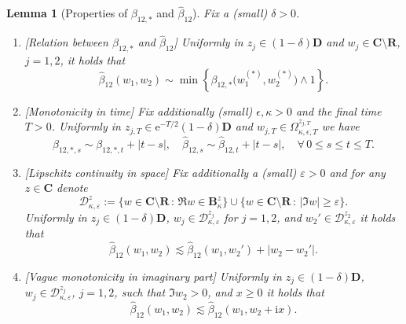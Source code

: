 \documentclass[10pt]{amsart}
\newtheorem{lemma}[theorem]{Lemma}
\numberwithin{equation}{section}
\newcommand{\R}{\mathbf{R}}
\newcommand{\C}{\mathbf{C}}
\newcommand{\ii}{\mathrm{i}}
\newcommand{\ee}{\mathrm{e}}
\begin{document}
\begin{lemma}[Properties of $\beta_{12,*}$ and $\widehat{\beta}_{12}$]\label{lem:beta_hat} Fix a (small) $\delta>0$.
\begin{enumerate}
\item \emph{[Relation between $\beta_{12,*}$ and $\widehat{\beta}_{12}$]} Uniformly in $z_j\in(1-\delta)\mathbf{D}$ and $w_j\in\C\setminus\R$, $j=1,2$, it holds that
\begin{equation}
\widehat{\beta}_{12}(w_1,w_2)\sim\min\left\lbrace\beta_{12,*}\big(w_1^{(*)}, w_2^{(*)}\big)\wedge 1\right\rbrace. 
\label{eq:beta_hat_to_beta}
\end{equation}
\item \emph{[Monotonicity in time]} Fix additionally (small) $\epsilon, \kappa>0$ and the final time $T>0$. Uniformly in $z_{j,T}\in \ee^{-T/2}(1-\delta)\mathbf{D}$ and $w_{j,T}\in \Omega^{z_{j,T}}_{\kappa,\epsilon,T}$ we have
\begin{equation}
\beta_{12,*,s}\sim \beta_{12,*,t}+|t-s|,\quad \widehat{\beta}_{12,s}\sim\widehat{\beta}_{12,t}+|t-s|,\quad\forall\, 0\le s\le t\le T.
\label{eq:gamma_monot}
\end{equation}
\item \emph{[Lipschitz continuity in space]} Fix additionally a (small) $\varepsilon>0$ and for any $z\in\C$ denote
\begin{equation}
\mathcal{D}^z_{\kappa,\varepsilon}:=\{w\in\C\setminus\R\,:\, \Re w\in \mathbf{B}^z_\kappa\}\cup\{w\in\C\setminus\R\,:\, |\Im w|\ge \varepsilon\}.
\end{equation}
Uniformly in $z_j\in (1-\delta)\mathbf{D}$, $w_j\in \mathcal{D}^{z_j}_{\kappa,\varepsilon}$ for $j=1,2$, and $w_2'\in\mathcal{D}^{z_2}_{\kappa,\varepsilon}$ it holds that
\begin{equation}
\widehat{\beta}_{12}(w_1,w_2) \lesssim \widehat{\beta}_{12}(w_1,w_2') + |w_2-w_2'|.
\label{eq:beta_hat_perturb}
\end{equation}
\item \emph{[Vague monotonicity in imaginary part]} Uniformly in $z_j\in (1-\delta)\mathbf{D}$, $w_j\in \mathcal{D}^{z_j}_{\kappa,\varepsilon}$, $j=1,2$, such that $\Im w_2>0$, and $x\ge 0$ it holds that
\begin{equation}
\widehat{\beta}_{12}(w_1,w_2)\lesssim \widehat{\beta}_{12}(w_1,w_2+\ii x).
\label{eq:beta_hat_vert_line}
\end{equation}
\end{enumerate}
\end{lemma}
\end{document}
